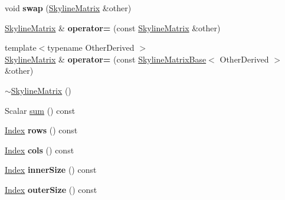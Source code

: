 \begin{DoxyCompactItemize}
void {\bfseries swap} (\hyperlink{class_eigen_1_1_skyline_matrix}{Skyline\+Matrix} \&other)
\item 
\mbox{\label{class_eigen_1_1_skyline_matrix_a00f9f9d0c8006efcc90074d8d6b046a2}} 
\hyperlink{class_eigen_1_1_skyline_matrix}{Skyline\+Matrix} \& {\bfseries operator=} (const \hyperlink{class_eigen_1_1_skyline_matrix}{Skyline\+Matrix} \&other)
\item 
\mbox{\label{class_eigen_1_1_skyline_matrix_a1f0aa06c7086d658416dc57076642525}} 
{\footnotesize template$<$typename Other\+Derived $>$ }\\\hyperlink{class_eigen_1_1_skyline_matrix}{Skyline\+Matrix} \& {\bfseries operator=} (const \hyperlink{class_eigen_1_1_skyline_matrix_base}{Skyline\+Matrix\+Base}$<$ Other\+Derived $>$ \&other)
\item 
\hyperlink{class_eigen_1_1_skyline_matrix_a456b254a757d26580b2c05fe270eaae7}{$\sim$\+Skyline\+Matrix} ()
\item 
Scalar \hyperlink{class_eigen_1_1_skyline_matrix_a56c9841de52e52744a2d5e6593979154}{sum} () const
\item 
\mbox{\label{class_eigen_1_1_skyline_matrix_aef3e3427735c8603eb4b7c33ac13646c}} 
\hyperlink{group___core___module_a554f30542cc2316add4b1ea0a492ff02}{Index} {\bfseries rows} () const
\item 
\mbox{\label{class_eigen_1_1_skyline_matrix_a4309fe0edce42fcab84301b0b94d21bb}} 
\hyperlink{group___core___module_a554f30542cc2316add4b1ea0a492ff02}{Index} {\bfseries cols} () const
\item 
\mbox{\label{class_eigen_1_1_skyline_matrix_ad6f7ee3facbf06074e47e2eb09582146}} 
\hyperlink{group___core___module_a554f30542cc2316add4b1ea0a492ff02}{Index} {\bfseries inner\+Size} () const
\item 
\mbox{\label{class_eigen_1_1_skyline_matrix_a10e9b4d8e2f0aa5e15ae619c7db3964a}} 
\hyperlink{group___core___module_a554f30542cc2316add4b1ea0a492ff02}{Index} {\bfseries outer\+Size} () const
\item 
\mbox{\label{class_eigen_1_1_skyline_matrix_a7dd385299f783331917605eedb1064af}} 

\end{DoxyCompactItemize}
